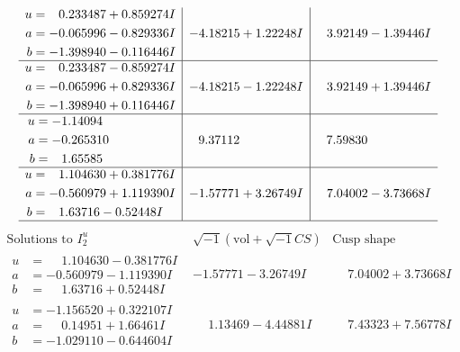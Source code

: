 \documentclass[1p]{elsarticle_modified}
\theoremstyle{definition}
\newcommand{\I}{\sqrt{-1}}
\begin{document}
$$\begin{array}{c|c|c}
\begin{aligned}
u &= \phantom{-}0.233487 + 0.859274 I \\
a &= -0.065996 - 0.829336 I \\
b &= -1.398940 - 0.116446 I\end{aligned}
 & -4.18215 + 1.22248 I & \phantom{-}3.92149 - 1.39446 I \\ \hline\begin{aligned}
u &= \phantom{-}0.233487 - 0.859274 I \\
a &= -0.065996 + 0.829336 I \\
b &= -1.398940 + 0.116446 I\end{aligned}
 & -4.18215 - 1.22248 I & \phantom{-}3.92149 + 1.39446 I \\ \hline\begin{aligned}
u &= -1.14094\phantom{ +0.000000I} \\
a &= -0.265310\phantom{ +0.000000I} \\
b &= \phantom{-}1.65585\phantom{ +0.000000I}\end{aligned}
 & \phantom{-}9.37112\phantom{ +0.000000I} & \phantom{-}7.59830\phantom{ +0.000000I} \\ \hline\begin{aligned}
u &= \phantom{-}1.104630 + 0.381776 I \\
a &= -0.560979 + 1.119390 I \\
b &= \phantom{-}1.63716 - 0.52448 I\end{aligned}
 & -1.57771 + 3.26749 I & \phantom{-}7.04002 - 3.73668 I\\
 \hline 
 \end{array}$$\newpage$$\begin{array}{c|c|c}  
\text{Solutions to }I^u_{2}& \I (\text{vol} + \sqrt{-1}CS) & \text{Cusp shape}\\
 \hline 
\begin{aligned}
u &= \phantom{-}1.104630 - 0.381776 I \\
a &= -0.560979 - 1.119390 I \\
b &= \phantom{-}1.63716 + 0.52448 I\end{aligned}
 & -1.57771 - 3.26749 I & \phantom{-}7.04002 + 3.73668 I \\ \hline\begin{aligned}
u &= -1.156520 + 0.322107 I \\
a &= \phantom{-}0.14951 + 1.66461 I \\
b &= -1.029110 - 0.644604 I\end{aligned}
 & \phantom{-}1.13469 - 4.44881 I & \phantom{-}7.43323 + 7.56778 I \\ \hline\begin{aligned}

\end{aligned}
\end{array}$$
\end{document}
